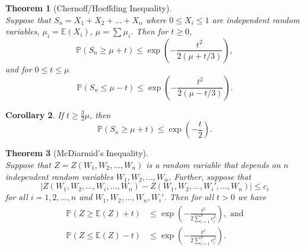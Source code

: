 \documentclass{article}
\newcommand{\E}{\mathbb{E}}
\renewcommand{\P}{\mathbb{P}}
\newtheorem{theorem}{Theorem}[section]
\newtheorem{corollary}[theorem]{Corollary}
\begin{document}
\begin{theorem}[Chernoff/Hoeffding Inequality]~\\ \label{CH}
Suppose that
$S_n = X_1 +X_2 +\ldots+X_n$ where $0\le X_i\le 1$ are independent random variables, $\mu_i=\E (X_i)$, $\mu=\sum \mu_i$. Then for $t\ge 0$,
\[
\P\left( S_n\ge \mu+t\right)\le \exp\left( -\frac{t^2}{2(\mu+t/3)}\right),
\]
and for $0\le t\le \mu$
\[
\P\left( S_n\le \mu-t\right)\le \exp\left(-\frac{t^2}{2(\mu-t/3)}\right).
\]
\end{theorem}
\begin{corollary}\label{CHc}
    If $t \geq \frac{3}{2} \mu$, then 
    \[
    \P(S_n\ge \mu + t)\le \exp\left( -\frac{t}{2}\right).
    \]
\end{corollary}
\begin{theorem}[McDiarmid's Inequality]~\\ \label{McD}
Suppose that $Z=Z(W_1,W_2,\ldots,W_n)$ is a random variable that depends on $n$ independent random variables $W_1,W_2,\ldots ,W_n$.
Further, suppose that 
\[
|Z(W_1,W_2,\ldots,W_i,\ldots,W_n)-Z(W_1,W_2,\ldots,W_i',\ldots,W_n)|\le c_i
\]
for all $i=1,2,\ldots, n$ and $W_1,W_2,\ldots,W_n,W_i'$. Then for all $t>0$ we have
\begin{align*}
    \P( Z\ge \E (Z)+t)&\le \exp\left(-\frac{t^2}{2\sum_{i=1}^n c_i^2}\right),\text{ and}\\
    \P( Z\le \E (Z)-t)&\le \exp\left(-\frac{t^2}{2\sum_{i=1}^n c_i^2}\right).
\end{align*}
\end{theorem}
\end{document}
